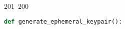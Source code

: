 201~200~\documentclass{article}
\begin{document}
\begin{lstlisting}[language=Python, caption=Key Pair Generation]
	                                                                                                                                                                                                                                                                                                	                                                                                                                                        	    	                                                                                                	                                                                                                                                                                                                                                                                                                                                	                                                                        	                                                                        	                                                                                                                                        	                                                                                                                                                                                                def generate_ephemeral_keypair():
	                                                                                                                                                                                                                                                                                                	                                                                                                                                        	    	                                                                                                	                                                                                                                                                                                                                                                                                                                                	                                                                        	                                                                        	                                                                                                                                        	                                                                                                                                                                                                    private_key = ec.generate_private_key(ec.SECP256R1(), default_backend())

\end{lstlisting}
\end{document}
